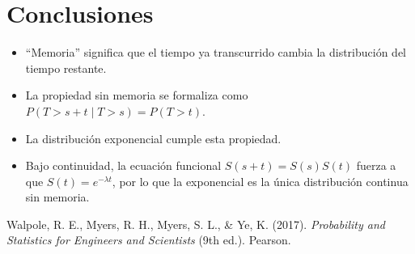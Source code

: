 \documentclass{article}
\theoremstyle{plain}
\theoremstyle{definition}
\begin{document}
\section*{Conclusiones}

\begin{itemize}
    \item ``Memoria'' significa que el tiempo ya transcurrido cambia la distribución del tiempo restante.
    \item La propiedad sin memoria se formaliza como $P(T>s+t\mid T>s)=P(T>t)$.
    \item La distribución exponencial cumple esta propiedad.
    \item Bajo continuidad, la ecuación funcional $S(s+t)=S(s)S(t)$ fuerza a que $S(t)=e^{-\lambda t}$, por lo que la exponencial es la única distribución continua sin memoria.
\end{itemize}

\begin{thebibliography}{}

Walpole, R. E., Myers, R. H., Myers, S. L., \& Ye, K. (2017).
\textit{Probability and Statistics for Engineers and Scientists} (9th ed.).
Pearson.

\end{thebibliography}
\end{document}
